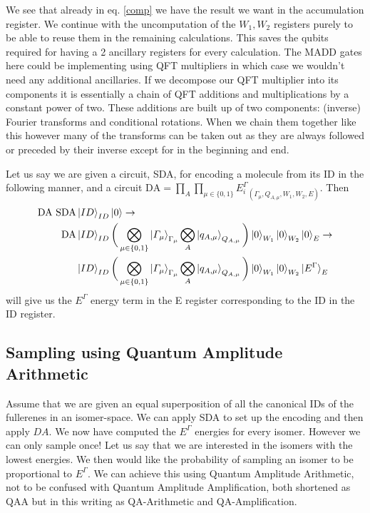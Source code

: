 \documentclass{article}
\begin{document}
We see that already in eq. \ref{comp} we have the result we want in the accumulation register. We continue with the uncomputation of the $W_1,W_2$ registers purely to be able to reuse them in the remaining calculations. This saves the qubits required for having a 2 ancillary registers for every calculation. The MADD gates here could be implementing using QFT multipliers\cite{perez2017} in which case we wouldn't need any additional ancillaries. If we decompose our QFT multiplier into its components it is essentially a chain of QFT additions\cite{draper2000,perez2017} and multiplications by a constant power of two. These additions are built up of two components: (inverse) Fourier transforms and conditional rotations. When we chain them together like this however many of the transforms can be taken out as they are always followed or preceded by their inverse except for in the beginning and end. 



Let us say we are given a circuit, SDA, for encoding a molecule from its ID in the following manner, and a circuit $\text{DA}=\prod_{A}\prod_{\mu\in \{0,1\}} {E_i^\Gamma}_{(\Gamma_\mu,Q_{A,\mu},W_1,W_2,E)}$. Then 
\begin{equation}
\begin{split}
    \text{DA}\ \text{SDA}&\ket{ID}_{ID}\ket{0}\to\\
    \text{DA}&\ket{ID}_{ID}\bigg(\bigotimes_{\mu\in \{0,1\}}\ket{\varGamma_\mu}_{\Gamma_\mu}\bigotimes_{A}\ket{q_{A,\mu}}_{Q_{A,\mu}}\bigg)\ket{0}_{W_1}\ket{0}_{W_2}\ket{0}_E \to\\
    &\ket{ID}_{ID}\bigg(\bigotimes_{\mu\in \{0,1\}}\ket{\varGamma_\mu}_{\Gamma_\mu}\bigotimes_{A}\ket{q_{A,\mu}}_{Q_{A,\mu}}\bigg)\ket{0}_{W_1}\ket{0}_{W_2}\ket{E^\Gamma}_E\\
\end{split}
\end{equation}
\noindent
will give us the $E^\Gamma$ energy term in the E register corresponding to the ID in the ID register.

\subsection{Sampling using Quantum Amplitude Arithmetic}
Assume that we are given an equal superposition of all the canonical IDs of the fullerenes in an isomer-space. We can apply SDA to set up the encoding and then apply $DA$. We now have computed the $E^\Gamma$ energies for every isomer. However we can only sample once! Let us say that we are interested in the isomers with the lowest energies. We then would like the probability of sampling an isomer to be proportional to $E^\Gamma$. We can achieve this using Quantum Amplitude Arithmetic\cite{wang2020}, not to be confused with Quantum Amplitude Amplification, both shortened as QAA but in this writing as QA-Arithmetic and QA-Amplification. 
\end{document}
